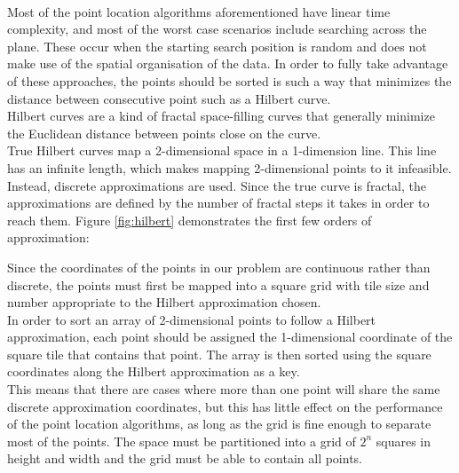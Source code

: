 \paragraph{}
Most of the point location algorithms aforementioned have linear time complexity, and most of the worst case scenarios include searching across the plane. These occur when the starting search position is random and does not make use of the spatial organisation of the data. In order to fully take advantage of these approaches, the points should be sorted is such a way that minimizes the distance between consecutive point such as a Hilbert curve. \\
Hilbert curves are a kind of fractal space-filling curves that generally minimize the Euclidean distance between points close on the curve.\\
True Hilbert curves map a 2-dimensional space in a 1-dimension line. This line has an infinite length, which makes mapping 2-dimensional points to it infeasible. Instead, discrete approximations are used. Since the true curve is fractal, the approximations are defined by the number of fractal steps it takes in order to reach them. Figure \ref*{fig:hilbert} demonstrates the first few orders of approximation:

\noindent
Since the coordinates of the points in our problem are continuous rather than discrete, the points must first be mapped into a square grid with tile size and number appropriate to the Hilbert approximation chosen.\\
In order to sort an array of 2-dimensional points to follow a Hilbert approximation, each point should be assigned the 1-dimensional coordinate of the square tile that contains that point. The array is then sorted using the square coordinates along the Hilbert approximation as a key.\\
This means that there are cases where more than one point will share the same discrete approximation coordinates, but this has little effect on the performance of the point location algorithms, as long as the grid is fine enough to separate most of the points. The space must be partitioned into a grid of $2^n$ squares in height and width and the grid must be able to contain all points.












